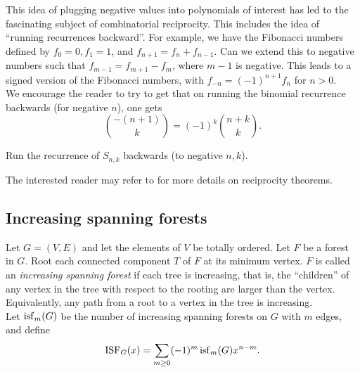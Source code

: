 	This idea of plugging negative values into polynomials of interest has led to the fascinating subject of combinatorial reciprocity. This includes the idea of ``running recurrences backward''. For example, we have the Fibonacci numbers defined by $f_0 = 0, f_1 = 1$, and $f_{n+1} = f_n + f_{n-1}$. Can we extend this to negative numbers such that $f_{m-1} = f_{m+1} - f_{m}$, where $m-1$ is negative. This leads to a signed version of the Fibonacci numbers, with $f_{-n} = (-1)^{n+1} f_n$ for $n > 0$.\\
	
	We encourage the reader to try  to get that on running the binomial recurrence backwards (for negative $n$), one gets
	\[ \binom{-(n+1)}{k} = (-1)^k \binom{n+k}{k}. \]

	\begin{exercise}
		Run the recurrence of $S_{n,k}$ backwards (to negative $n,k$).
	\end{exercise}

	The interested reader may refer to \cite{crt} for more details on reciprocity theorems.

\subsection{Increasing spanning forests}

	\begin{fdef}
		Let $G = (V,E)$ and let the elements of $V$ be totally ordered. Let $F$ be a forest in $G$. Root each connected component $T$ of $F$ at its minimum vertex. $F$ is called an \emph{increasing spanning forest} if each tree is increasing, that is, the ``children'' of any vertex in the tree with respect to the rooting are larger than the vertex. Equivalently, any path from a root to a vertex in the tree is increasing.\\
		Let $\operatorname{isf}_m(G)$ be the number of increasing spanning forests on $G$ with $m$ edges, and define
		\[ \operatorname{ISF}_G(x) = \sum_{m \ge 0} (-1)^m \operatorname{isf}_m(G) x^{n-m}. \]
	\end{fdef}


